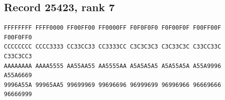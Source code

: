 \documentclass[11pt]{amsart}
\theoremstyle{definition}
\theoremstyle{remark}
\numberwithin{equation}{section}
\numberwithin{table}{section}
\begin{document}
\subsection*{Record 25423, rank 7}
\begin{Verbatim}[fontsize=\scriptsize,xleftmargin=1em]
FFFFFFFF FFFF0000 FF00FF00 FF0000FF F0F0F0F0 F0F00F0F F00FF00F F00F0FF0
CCCCCCCC CCCC3333 CC33CC33 CC3333CC C3C3C3C3 C3C33C3C C33CC33C C33C3CC3
AAAAAAAA AAAA5555 AA55AA55 AA5555AA A5A5A5A5 A5A55A5A A55A9996 A55A6669
9996A55A 99965AA5 99699969 99696696 96999699 96996966 96669666 96666999
\end{Verbatim}
\par
{}\par
\end{document}
